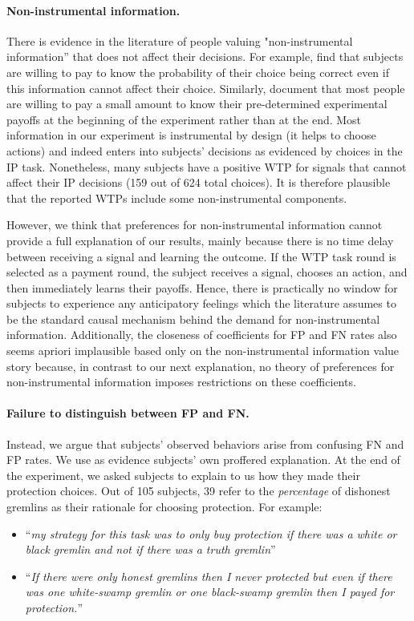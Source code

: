 \documentclass[12pt,a4paper]{article}
\begin{document}
\paragraph{Non-instrumental information.} There is evidence in the literature of people valuing "non-instrumental information'' that does not affect their decisions. For example, \citet{eliaz_paying_2010} find that subjects are willing to pay to know the probability of their choice being correct even if this information cannot affect their choice. Similarly, \citet{ganguly_fantasy_2017} document that most people are willing to pay a small amount to know their pre-determined experimental payoffs at the beginning of the experiment rather than at the end. 
Most information in our experiment is instrumental by design (it helps to choose actions) and indeed enters into subjects' decisions as evidenced by choices in the IP task. Nonetheless, many subjects have a positive WTP for signals that cannot affect their IP decisions (159 out of 624 total choices). It is therefore plausible that the reported WTPs include some non-instrumental components. 

However, we think that preferences for non-instrumental information cannot provide a full explanation of our results, mainly because there is no time delay between receiving a signal and learning the outcome. If the WTP task round is selected as a payment round, the subject receives a signal, chooses an action, and then immediately learns their payoffs. Hence, there is practically no window for subjects to experience any anticipatory feelings which the literature assumes to be the standard causal mechanism behind the demand for non-instrumental information. Additionally, the closeness of coefficients for FP and FN rates also seems apriori implausible based only on the non-instrumental information value story because, in contrast to our next explanation, no theory of preferences for non-instrumental information imposes restrictions on these coefficients.

\paragraph{Failure to distinguish between FP and FN.} Instead, we argue that subjects' observed behaviors arise from confusing FN and FP rates. We use as evidence subjects' own proffered explanation.  At the end of the experiment, we asked subjects to explain to us how they made their protection choices.  Out of 105 subjects, 39 refer to the \textit{percentage} \normalfont  of dishonest gremlins as their rationale for choosing protection. For example:
\begin{itemize}
	\item ``\emph{my strategy for this task was to only buy protection if there was a white or black gremlin and not if there was a truth gremlin}''
	\item ``\emph{If there were only honest gremlins then I never protected but even if there was one white-swamp gremlin or one black-swamp gremlin then I payed for protection.}''
\end{itemize}
\end{document}
